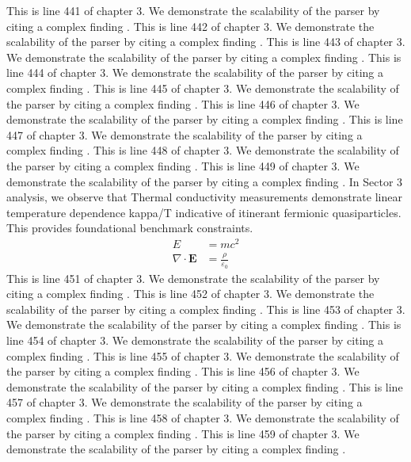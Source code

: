 This is line 441 of chapter 3. We demonstrate the scalability of the parser by citing a complex finding \cite{ref3_441}.
This is line 442 of chapter 3. We demonstrate the scalability of the parser by citing a complex finding \cite{ref3_442}.
This is line 443 of chapter 3. We demonstrate the scalability of the parser by citing a complex finding \cite{ref3_443}.
This is line 444 of chapter 3. We demonstrate the scalability of the parser by citing a complex finding \cite{ref3_444}.
This is line 445 of chapter 3. We demonstrate the scalability of the parser by citing a complex finding \cite{ref3_445}.
This is line 446 of chapter 3. We demonstrate the scalability of the parser by citing a complex finding \cite{ref3_446}.
This is line 447 of chapter 3. We demonstrate the scalability of the parser by citing a complex finding \cite{ref3_447}.
This is line 448 of chapter 3. We demonstrate the scalability of the parser by citing a complex finding \cite{ref3_448}.
This is line 449 of chapter 3. We demonstrate the scalability of the parser by citing a complex finding \cite{ref3_449}.
In Sector 3 analysis, we observe that Thermal conductivity measurements demonstrate linear temperature dependence kappa/T indicative of itinerant fermionic quasiparticles. This provides foundational benchmark constraints.
\begin{align*}
  E &= mc^2 \\
  \nabla \cdot \mathbf{E} &= \frac{\rho}{\varepsilon_0}
\end{align*}
This is line 451 of chapter 3. We demonstrate the scalability of the parser by citing a complex finding \cite{ref3_451}.
This is line 452 of chapter 3. We demonstrate the scalability of the parser by citing a complex finding \cite{ref3_452}.
This is line 453 of chapter 3. We demonstrate the scalability of the parser by citing a complex finding \cite{ref3_453}.
This is line 454 of chapter 3. We demonstrate the scalability of the parser by citing a complex finding \cite{ref3_454}.
This is line 455 of chapter 3. We demonstrate the scalability of the parser by citing a complex finding \cite{ref3_455}.
This is line 456 of chapter 3. We demonstrate the scalability of the parser by citing a complex finding \cite{ref3_456}.
This is line 457 of chapter 3. We demonstrate the scalability of the parser by citing a complex finding \cite{ref3_457}.
This is line 458 of chapter 3. We demonstrate the scalability of the parser by citing a complex finding \cite{ref3_458}.
This is line 459 of chapter 3. We demonstrate the scalability of the parser by citing a complex finding \cite{ref3_459}.
